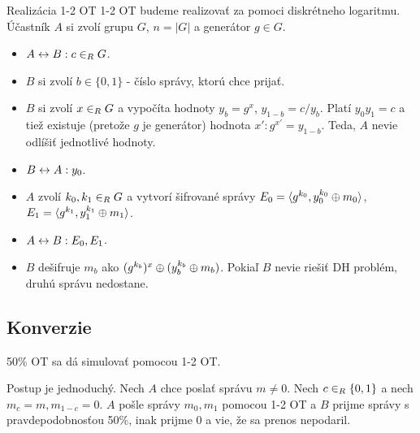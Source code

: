 \begin{priklad}{Realizácia 1-2 OT}
 1-2 OT budeme realizovať za pomoci diskrétneho logaritmu.
 Účastník $A$ si zvolí grupu $G$, $n=|G|$ a generátor $g\in G$.
 \begin{itemize}
    \compactlist
    \item $A \leftrightarrow B: c \in_{R} G$.
    \item $B$ si zvolí $b\in\{0,1\}$ - číslo správy, ktorú chce
    prijať.
    \item $B$ si zvolí $x \in_{R} G$ a vypočíta hodnoty $y_b = g^x$,
    $y_{1-b} = c/ y_b$. Platí $y_0 y_1 = c$ a tiež existuje (pretože
    $g$ je generátor) hodnota $x': g^{x'} = y_{1-b}$. Teda, $A$ nevie
    odlíšiť jednotlivé hodnoty.
    \item $B \leftrightarrow A: y_0$.
    \item $A$ zvolí $k_0,k_1 \in_{R} G$ a vytvorí šifrované správy 
    $E_0 = \langle g^{k_0}, y_0^{k_0} \oplus m_0 \rangle$,
    $E_1 = \langle g^{k_1}, y_1^{k_1} \oplus m_1 \rangle$.
    \item $A \leftrightarrow B: E_0, E_1$.
    \item $B$ dešifruje $m_b$ ako $(g^{k_b})^x \oplus (y_b ^ {k_b} \oplus
    m_b)$.
    Pokiaľ $B$ nevie riešiť DH problém, druhú správu nedostane.
 \end{itemize}
\end{priklad}

\subsection{Konverzie}

\begin{lema}
    50\% OT sa dá simulovať pomocou 1-2 OT.
\end{lema}
\begin{dokaz}
    Postup je jednoduchý. Nech $A$ chce poslať správu $m \ne 0$.
    Nech $c \in_{R} \{0,1\}$ a nech $m_c = m, m_{1-c} = 0$. $A$ pošle
    správy $m_0, m_1$ pomocou 1-2 OT a $B$ prijme správy s
    pravdepodobnosťou 50\%, inak prijme 0 a vie, že sa prenos
    nepodaril.
\end{dokaz}

